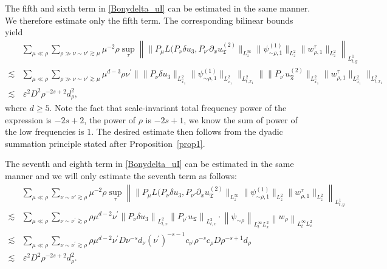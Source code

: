 \documentclass[11pt,letterpaper,reqno]{amsart}
\numberwithin{equation}{section}
\theoremstyle{definition}
\theoremstyle{remark}
\begin{document}
The fifth and sixth term in \eqref{Bonydelta_uI} can be estimated in the same manner. We therefore estimate only the fifth term. The corresponding bilinear bounds yield
\begin{align*}
    &\sum_{\mu\ll\rho} 
\sum_{ \rho \gg \nu\sim\nu'\gtrsim\mu}  \mu^{-2} \rho \sup_\tau\left\|\|P_\mu L(P_\nu\delta u_3,P_{\nu'}\partial_xu_{\mathfrak T}^{(2)} \|_{L^\infty_z}\|\psi_{\sim\rho,1}^{(1)}\|_{L^2_z}
\|w_{\rho,1}^{\tau}\|_{L^2_z}\right\|_{L^1_{t,y}}\\
\lesssim&     \sum_{\mu\ll\rho} \sum_{ \rho \gg \nu\sim\nu'\gtrsim\mu}  \mu^{d-3} \rho \nu^\prime \big \| \| P_\nu\delta u_3\|_{L^2_{\widehat{x}_1}} \| \psi_{\sim\rho,1}^{(1)}\|_{L^2_{\widehat{x}_1}} \big\|_{L^2_{ t,x_1}} \big \| \| P_{\nu^\prime}u_{\mathfrak T}^{(2)}\|_{L^2_{\widehat{x}_1}} \| w_{\rho,1}^{\tau}\|_{L^2_{\widehat{x}_1}} \big\|_{L^2_{ t,x_1}}\\
\lesssim &\, \varepsilon^2  D^2 \rho^{-2s+2} d_\rho^2,
\end{align*}
where \(d \geq 5\).
Note the fact that scale-invariant total frequency power of the expression is \(-2s+2\), the power of \(\rho \) is \( -2s+1\), we know the sum of power of the  low frequencies is \(1\). The desired estimate then follows from the dyadic summation principle stated after Proposition~\ref{prop1}. 




The seventh and eighth term in \eqref{Bonydelta_uI} can be estimated in the same manner and we will only estimate the seventh term as follows:
\begin{align*}
    &\sum_{\mu\ll\rho} 
\sum_{   \nu\sim\nu'\gtrsim\rho}  \mu^{-2} \rho \sup_\tau\left\|\|P_\mu L(P_\nu\delta u_3,P_{\nu'}\partial_xu_{\mathfrak T}^{(2)} \|_{L^\infty_z}\|\psi_{\sim\rho,1}^{(1)}\|_{L^2_z}
\|w_{\rho,1}^{\tau}\|_{L^2_z}\right\|_{L^1_{t,y}}\\
\lesssim&  \sum_{\mu \ll \rho} \sum_{\nu\sim \nu^\prime \gtrsim \rho }    \rho  \mu^{d-2} \nu^\prime  \left\|  P_\nu  \delta  u_3 \right\|_{L^2_{t,x}} \left\|  P_{\nu^\prime}   u_{\mathfrak{T}} \right\|_{L^2_{t,x}}   \cdot \left\|  \psi_{\sim \rho } \right\|_{L^\infty_t L^2_x}   \left\|    w_{\rho} \right\|_{L^\infty_t L^2_x}  \\
\lesssim &   \sum_{\mu \ll \rho} \sum_{\nu\sim \nu^\prime \gtrsim \rho }    \rho  \mu^{d-2} \nu^\prime D\nu^{-s} d_\nu (\nu^\prime)^{-s-1} c_{\nu^\prime} \rho^{-s} c_\rho  D \rho^{-s+1} d_\rho \\
\lesssim &\, \varepsilon^2 D^2 \rho^{-2s+2} d_\rho^2.
\end{align*}
\end{document}
